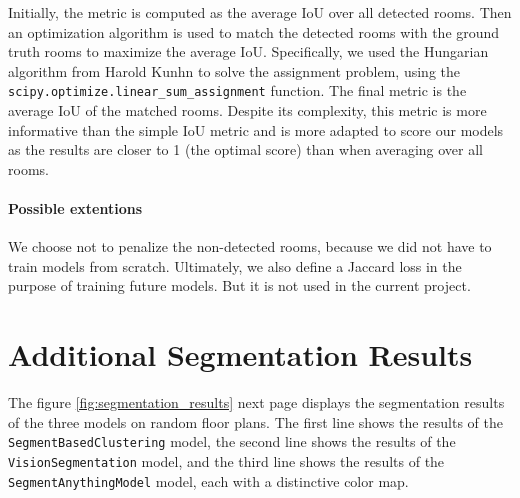\documentclass[11pt]{article}
\begin{document}
Initially, the metric is computed as the average IoU over all detected rooms.
Then an optimization algorithm is used to match the detected rooms with the ground truth rooms
to maximize the average IoU. Specifically, we used the Hungarian algorithm from 
Harold Kunhn to solve the
assignment problem, using the \texttt{scipy.optimize.linear\_sum\_assignment} function.
The final metric is the average IoU of the matched rooms.
Despite its complexity, this metric is more informative than the simple IoU metric 
and is more adapted to score our models as the results are closer to 1 (the 
optimal score) than when averaging over all rooms.

\paragraph{Possible extentions}
We choose not to penalize the non-detected rooms, because we 
did not have to train models from scratch. Ultimately, we also define a Jaccard 
loss in the purpose of training future models. But it is not used in the current project.


\section{Additional Segmentation Results}

The figure \ref{fig:segmentation_results} next page displays the segmentation results of the three models on random
floor plans. The first line shows the results of the \texttt{SegmentBasedClustering} model,
the second line shows the results of the \texttt{VisionSegmentation} model, and the third line
shows the results of the \texttt{SegmentAnythingModel} model, each with a 
distinctive color map.
\end{document}
